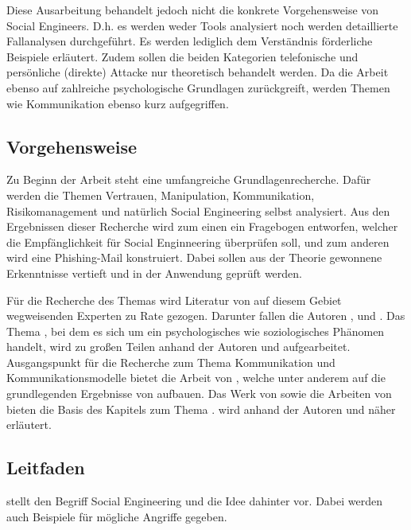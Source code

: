 Diese Ausarbeitung behandelt jedoch nicht die konkrete Vorgehensweise von Social Engineers.
D.h. es werden weder Tools analysiert noch werden detaillierte Fallanalysen durchgeführt.
Es werden lediglich dem Verständnis förderliche Beispiele erläutert.
Zudem sollen die beiden Kategorien telefonische und persönliche (direkte) Attacke nur theoretisch behandelt werden.
Da die Arbeit ebenso auf zahlreiche psychologische Grundlagen zurückgreift, werden Themen wie  Kommunikation ebenso kurz aufgegriffen.
 	

\subsection{Vorgehensweise}\label{sec:vorgehensweise}
Zu Beginn der Arbeit steht eine umfangreiche Grundlagenrecherche.
Dafür werden die Themen Vertrauen, Manipulation, Kommunikation, Risikomanagement und natürlich Social Engineering selbst analysiert.
Aus den Ergebnissen dieser Recherche wird zum einen ein Fragebogen entworfen, welcher die Empfänglichkeit für Social Enginneering überprüfen soll, und zum anderen wird eine Phishing-Mail konstruiert.
Dabei sollen aus der Theorie gewonnene Erkenntnisse vertieft und in der Anwendung geprüft werden.

Für die Recherche des Themas  wird Literatur von auf diesem Gebiet wegweisenden Experten zu Rate gezogen. Darunter fallen die Autoren ,  und .
Das Thema , bei dem es sich um ein psychologisches wie soziologisches Phänomen handelt, wird zu großen Teilen anhand der Autoren  und  aufgearbeitet.
Ausgangspunkt für die Recherche zum Thema Kommunikation und Kommunikationsmodelle bietet die Arbeit  von , welche unter anderem auf die grundlegenden Ergebnisse von  aufbauen.
Das Werk  von  sowie die Arbeiten von  bieten die Basis des Kapitels zum Thema .
 wird anhand der Autoren  und  näher erläutert.

\subsection{Leitfaden}\label{sec:aufbau_der_arbeit}
 stellt den Begriff Social Engineering und die Idee dahinter vor.
Dabei werden auch Beispiele für mögliche Angriffe gegeben.

